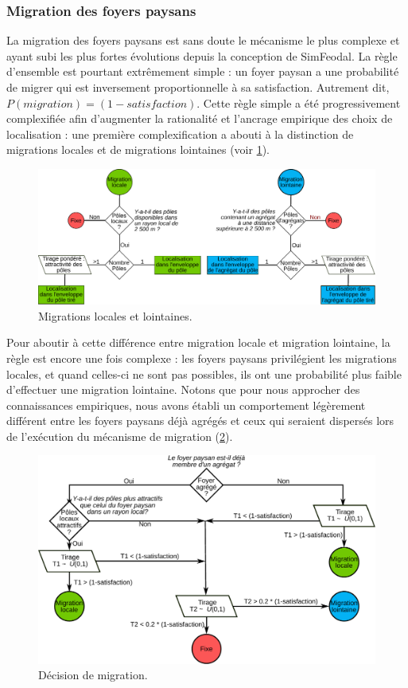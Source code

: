 	\subsubsection{Migration des foyers paysans \label{sssec:migration}}

La migration des foyers paysans est sans doute le mécanisme le plus complexe et ayant subi les plus fortes évolutions depuis la conception de SimFeodal.
La règle d'ensemble est pourtant extrêmement simple : un foyer paysan a une probabilité de migrer qui est inversement proportionnelle à sa satisfaction. Autrement dit, $P \left( migration \right) = \left( 1 - satisfaction \right)$.
Cette règle simple a été progressivement complexifiée afin d'augmenter la rationalité et l'ancrage empirique des choix de localisation : une première complexification a abouti à la distinction de migrations \og locales\fg{} et de migrations \og lointaines\fg{} (voir \cref{fig:migrations-locales-lointaines}).

\begin{figure}[H]
\centering
\includegraphics[width=1\linewidth]{img/migration_locale-lointaine.pdf}
\caption{Migrations locales et lointaines.}
\label{fig:migrations-locales-lointaines}
\end{figure}
Pour aboutir à cette différence entre migration locale et migration lointaine, la règle est encore une fois complexe : les foyers paysans privilégient les migrations locales, et quand celles-ci ne sont pas possibles, ils ont une probabilité plus faible d'effectuer une migration lointaine. Notons que pour nous approcher des connaissances empiriques, nous avons établi un comportement légèrement différent entre les foyers paysans déjà agrégés et ceux qui seraient dispersés lors de l'exécution du mécanisme de migration (\cref{fig:choix-migration}).
\begin{figure}[H]
	\centering
	\includegraphics[width=0.9\linewidth]{img/choix_migration.pdf}
	\caption{Décision de migration.}
	\label{fig:choix-migration}
\end{figure}

